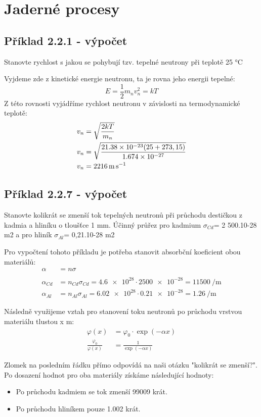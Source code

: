 \section{Jaderné procesy}

\subsection{Příklad 2.2.1 - výpočet}
\begin{zadani}
    Stanovte rychlost s jakou se pohybují  tzv. tepelné neutrony
    při teplotě 25 °C 
\end{zadani}

Vyjdeme zde z kinetické energie neutronu, ta je rovna jeho energii tepelné:
\[
    E=\frac{1}{2}m_{n} v_{n}^{2}=kT 
\]
Z této rovnosti vyjádříme rychlost neutronu v závislosti na termodynamické teplotě:
\begin{align*}
  v_{n} &= \sqrt{\frac{2kT}{m_{n}}} \\ 
  v_{n} &= \sqrt{\frac{2\num{1.38e-23}(25+273,15)}{\num{1,674e-27}}} \\ 
  v_{n} &= \qty{2216}{\meter\per\second}
\end{align*}


\subsection{Příklad 2.2.7 - výpočet}
\begin{zadani}
    Stanovte kolikrát se zmenší tok tepelných neutronů při průchodu
    destičkou z kadmia a hliníku o tloušťce 1 mm. Účinný průřez pro
    kadmium  \(\sigma_{Cd} \)= 2 500.10-28 m2  a pro hliník  \(\sigma_{Al} \)= 0,21.10-28 m2 
\end{zadani}

Pro vypočtení tohoto příkladu je potřeba stanovit absorbční koeficient obou materiálů:
\begin{align*}
    \alpha &= n\sigma \\\\
    \alpha_{Cd}  &= n_{Cd} \sigma_{Cd} = \num{4,6e28}\cdot \num{2500e-28}= \qty{11500}{\per\meter}\\
    \alpha_{Al}  &= n_{Al} \sigma_{Al} = \num{6,02e28}\cdot \num{0,21e-28}= \qty{1,26}{\per\meter}
\end{align*}

Následně využijeme vztah pro stanovení toku neutronů po průchodu vrstvou materiálu tlustou x m:
\begin{align*}
    \varphi(x) &= \varphi_{0} \cdot \exp(-\alpha x)\\
    \frac{\varphi_{0}}{\varphi(x)} &=\frac{1}{\exp(-\alpha x)}
\end{align*}

Zlomek na posledním řádku přímo odpovídá na naši otázku "kolikrát se zmenší?". Po dosazení hodnot pro oba materiály získáme následující hodnoty:
\begin{itemize}
    \item Po průchodu kadmiem se tok zmenší \num{99009} krát. 
    \item Po průchodu hliníkem pouze \num{1,002} krát.
\end{itemize}





